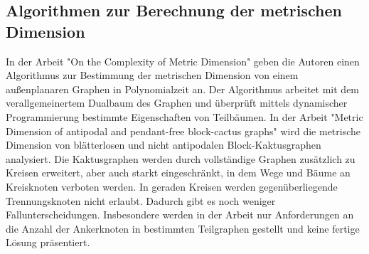 \subsection{Algorithmen zur Berechnung der metrischen Dimension}
\vspace{-2mm}
In der Arbeit "On the Complexity of Metric Dimension"\cite{aussenplanar} geben die Autoren einen Algorithmus zur Bestimmung der metrischen Dimension von einem außenplanaren Graphen in Polynomialzeit an. Der Algorithmus arbeitet mit dem verallgemeinertem Dualbaum des Graphen und überprüft mittels dynamischer Programmierung bestimmte Eigenschaften von Teilbäumen. 
\vspace{-1mm}
\newline\newline
In der Arbeit "Metric Dimension of antipodal and pendant-free block-cactus graphs"\cite{cactusblock} wird die metrische Dimension von blätterlosen und nicht antipodalen Block-Kaktusgraphen analysiert. Die Kaktusgraphen werden durch vollständige Graphen zusätzlich zu Kreisen erweitert, aber auch starkt eingeschränkt, in dem Wege und Bäume an Kreisknoten verboten werden. In geraden Kreisen werden gegenüberliegende Trennungsknoten nicht erlaubt. Dadurch gibt es noch weniger Fallunterscheidungen. Insbesondere werden in der Arbeit nur Anforderungen an die Anzahl der Ankerknoten in bestimmten Teilgraphen gestellt und keine fertige Lösung präsentiert.
\vspace{-5mm}

